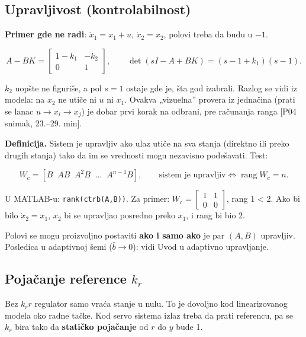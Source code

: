\documentclass[11pt,a4paper,parskip=half,headsepline,numbers=noenddot]{scrartcl}
\DeclareRobustCommand{\izvor}[1]{{\small\color{izvorC}[#1]}}
\begin{document}
\subsection{Upravljivost (kontrolabilnost)}

\textbf{Primer gde ne radi}: \(\dot x_1 = x_1 + u\), \(\dot x_2 = x_2\), polovi treba da budu u \(-1\).

\[A - BK = \begin{bmatrix}1 - k_1 & -k_2\\ 0 & 1\end{bmatrix},\qquad \det(sI - A + BK) = (s - 1 + k_1)(s - 1).\]

\(k_2\) uopšte ne figuriše, a pol \(s = 1\) ostaje gde je, šta god izabrali. Razlog se vidi iz modela: na \(x_2\) ne utiče ni \(u\) ni \(x_1\). Ovakva „vizuelna'' provera iz jednačina (prati se lanac \(u \to x_i \to x_j\)) je dobar prvi korak na odbrani, pre računanja ranga \izvor{P04 snimak, 23.--29. min}.

\textbf{Definicija.} Sistem je upravljiv ako ulaz utiče na sva stanja (direktno ili preko drugih stanja) tako da im se vrednosti mogu nezavisno podešavati. Test:

\[W_c = [B\;\; AB\;\; A^2B\;\; \dots\;\; A^{n-1}B],\qquad \text{sistem je upravljiv} \iff \operatorname{rang}W_c = n .\]

U MATLAB-u: \texttt{rank(\allowbreak{}ctrb(\allowbreak{}A,\allowbreak{}B))}. Za primer: \(W_c = \begin{bmatrix}1 & 1\\ 0 & 0\end{bmatrix}\), rang 1 \textless{} 2. Ako bi bilo \(\dot x_2 = x_1\), \(x_2\) bi se upravljao posredno preko \(x_1\), i rang bi bio 2.

\begin{kljucna}
Polovi se mogu proizvoljno postaviti \textbf{ako i samo ako} je par \((A, B)\) upravljiv. Posledica u adaptivnoj šemi (\(\hat b \to 0\)): vidi Uvod u adaptivno upravljanje.
\end{kljucna}

\subsection{\texorpdfstring{Pojačanje reference \(k_r\)}{Pojačanje reference k\_r}}

Bez \(k_r r\) regulator samo vraća stanje u nulu. To je dovoljno kod linearizovanog modela oko radne tačke. Kod servo sistema izlaz treba da prati referencu, pa se \(k_r\) bira tako da \textbf{statičko pojačanje} od \(r\) do \(y\) bude 1.
\end{document}
